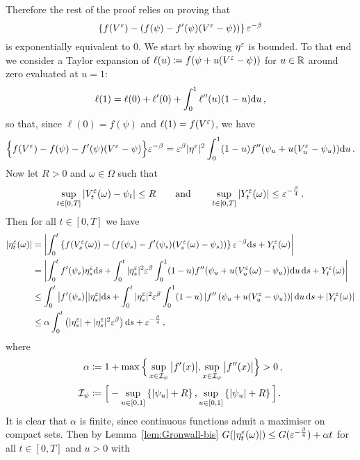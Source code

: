 Therefore the rest of the proof relies on proving that 
\[
\left\{f(V^\varepsilon) - \left(f(\psi) - f'(\psi)(V^\varepsilon -\psi)\right)\right\}\varepsilon^{-\beta}
\]
is exponentially equivalent to $0$. %
We start by showing $\eta^\varepsilon$ is bounded. To that end we consider a Taylor expansion of $\ell(u) \coloneqq f(\psi+u(V^\varepsilon - \psi))$ for $u\in\mathbb{R}$ around zero evaluated at $u=1$:
\[
\ell(1)=\ell(0)+\ell'(0) + \int_0^1 \ell''(u)(1-u)\mathrm{d} u\,,
\]
so that, since $\ell(0)=f(\psi)$ and $\ell(1)=f(V^\varepsilon)$, we have 
\[
\Big\{f(V^\varepsilon) - f(\psi) - f'(\psi)(V^\varepsilon -\psi)\Big\}\varepsilon^{-\beta}
= \varepsilon^\beta |\eta^\varepsilon|^2 \int_0^1 (1-u)f''(\psi_u + u (V^\varepsilon_u - \psi_u))\mathrm{d} u\,.
\]
Now let $R>0$ and $\omega \in \Omega$ such that 
\[
\sup_{t \in [0,T]}|V_t^\varepsilon(\omega) - \psi_t|\leq R
\qquad\text{and}\qquad 
\sup_{t \in [0,T]}|Y^\varepsilon_t(\omega)| \leq \varepsilon^{-\frac{\beta}{4}}\,.
\]
Then for all $t\in[0,T]$ we have
\begin{align*}
\left|\eta_{t}^\varepsilon(\omega)\right| &= \left\lvert \int_0^t\left\{f(V^\varepsilon_s(\omega)) - \left(f(\psi_s) - f'(\psi_s)(V_s^\varepsilon(\omega) -\psi_s)\right)\right\}\varepsilon^{-\beta}\mathrm{d} s + Y^{\varepsilon}_t(\omega)\right\rvert \\
&= \left\lvert\int_0^t f'(\psi_s)\eta_{s}^\varepsilon\mathrm{d} s + \int_0^t|\eta_{s}^\varepsilon|^2\varepsilon^{\beta} \int_0^1(1-u)f''(\psi_u + u(V^\varepsilon_u(\omega) - \psi_u))\mathrm{d} u\,\mathrm{d} s + Y_t^\varepsilon(\omega)\right\rvert \\
&\leq \int_0^t\big|f'(\psi_s)\big| |\eta_{s}^\varepsilon|\mathrm{d} s + \int_0^t|\eta_{s}^\varepsilon|^2\varepsilon^{\beta} \int_0^1(1-u)\left|f''\left(\psi_u + u(V^\varepsilon_u - \psi_u)\right)\right|\mathrm{d} u\,\mathrm{d} s + \left|Y_t^\varepsilon(\omega)\right|\\
&\leq \alpha \int_0^t\left(|\eta_{s}^\varepsilon| + |\eta_{s}^\varepsilon|^2\varepsilon^{\beta}\right) \mathrm{d} s + \varepsilon^{-\frac{\beta}{4}}\,,
\end{align*}
where 
\begin{align*}
\alpha &\coloneqq 1+\max\Big\{\sup_{x \in \mathcal{I}_\psi}\big|f'(x)\big|, \sup_{x\in \mathcal{I}_\psi}\big|f''(x)\big| \Big\} > 0\,, \\
\mathcal{I}_\psi &\coloneqq  \Big[-\sup_{u \in [0,1]}\left\{|\psi_u|+ R\right\},\sup_{u \in [0,1]}\left\{|\psi_u| + R\right\}\Big]\,.
\end{align*}
It is clear that $\alpha$ is finite, since continuous functions admit a maximiser on compact sets. Then by Lemma~\ref{lem:Gronwall-bis} $G(|\eta_{t}^\varepsilon(\omega)|) \leq G(\varepsilon^{-\frac{\beta}{4}}) + \alpha t$ for all $t \in [0,T]$ and $u>0$ with 
